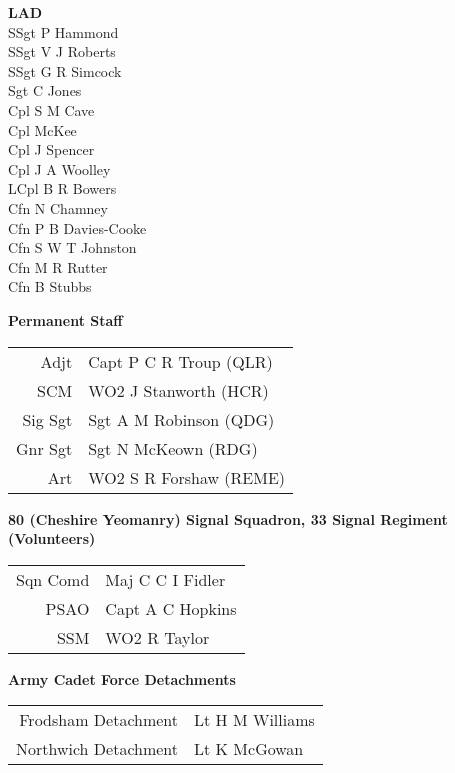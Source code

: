\begin{multicols}{2}
  \textbf{LAD} \\
  SSgt P Hammond \\
  SSgt V J Roberts \\
  SSgt G R Simcock \\
  Sgt C Jones \\
  Cpl S M Cave \\
  Cpl McKee \\
  Cpl J Spencer \\
  Cpl J A Woolley \\
  LCpl B R Bowers \\
  Cfn N Chamney \\
  Cfn P B Davies-Cooke \\
  Cfn S W T Johnston \\
  Cfn M R Rutter \\
  Cfn B Stubbs \\
\end{multicols}

\begin{center}
  \Large
  \textbf{Permanent Staff}
\end{center}

\begin{center}
  \begin{tabular}{rl}
    Adjt & Capt P C R Troup (QLR) \\
    SCM & WO2 J Stanworth (HCR) \\
    Sig Sgt & Sgt A M Robinson (QDG) \\
    Gnr Sgt & Sgt N McKeown (RDG) \\
    Art & WO2 S R Forshaw (REME) \\
  \end{tabular}
\end{center}

\begin{center}
  \Large
  \textbf{80 (Cheshire Yeomanry) Signal Squadron, 33 Signal Regiment (Volunteers)}
\end{center}

\begin{center}
  \begin{tabular}{rl}
    Sqn Comd & Maj C C I Fidler \\
    PSAO & Capt A C Hopkins \\
    SSM & WO2 R Taylor \\
  \end{tabular}
\end{center}

\begin{center}
  \Large
  \textbf{Army Cadet Force Detachments}
\end{center}

\begin{center}
  \begin{tabular}{rl}
    Frodsham Detachment & Lt H M Williams \\
    Northwich Detachment & Lt K McGowan \\
  \end{tabular}
\end{center}
